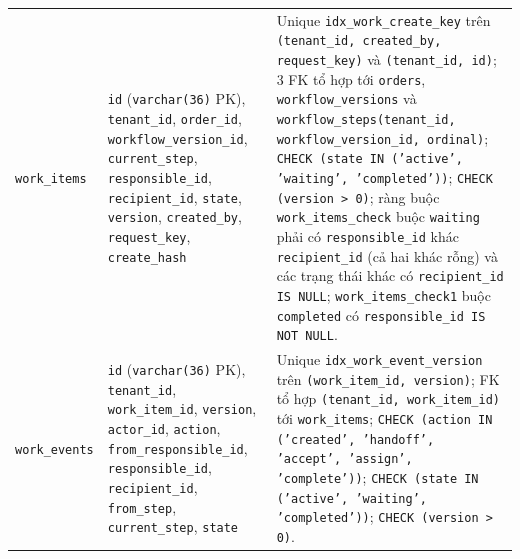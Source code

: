 \begin{table}[htbp]
\begin{tabularx}{\linewidth}{@{}
    >{\raggedright\arraybackslash}p{3.2cm}
    >{\raggedright\arraybackslash}p{5.2cm}
    >{\raggedright\arraybackslash}X@{}}
    \texttt{work\_items} &
    \texttt{id} (\texttt{varchar(36)} PK), \texttt{tenant\_id}, \texttt{order\_id}, \texttt{workflow\_version\_id}, \texttt{current\_step}, \texttt{responsible\_id}, \texttt{recipient\_id}, \texttt{state}, \texttt{version}, \texttt{created\_by}, \texttt{request\_key}, \texttt{create\_hash} &
    Unique \texttt{idx\_\hspace{0pt}work\_\hspace{0pt}create\_\hspace{0pt}key} trên \texttt{(tenant\_id, created\_by, request\_key)} và \texttt{(tenant\_id, id)}; 3 FK tổ hợp tới \texttt{orders}, \texttt{workflow\_\hspace{0pt}versions} và \texttt{workflow\_\hspace{0pt}steps(tenant\_id, workflow\_version\_id, ordinal)}; \texttt{CHECK (state IN ('active', 'waiting', 'completed'))}; \texttt{CHECK (version > 0)}; ràng buộc \texttt{work\_\hspace{0pt}items\_\hspace{0pt}check} buộc \texttt{waiting} phải có \texttt{responsible\_id} khác \texttt{recipient\_id} (cả hai khác rỗng) và các trạng thái khác có \texttt{recipient\_id IS NULL}; \texttt{work\_\hspace{0pt}items\_\hspace{0pt}check1} buộc \texttt{completed} có \texttt{responsible\_id IS NOT NULL}. \\
    \texttt{work\_events} &
    \texttt{id} (\texttt{varchar(36)} PK), \texttt{tenant\_id}, \texttt{work\_item\_id}, \texttt{version}, \texttt{actor\_id}, \texttt{action}, \texttt{from\_responsible\_id}, \texttt{responsible\_id}, \texttt{recipient\_id}, \texttt{from\_step}, \texttt{current\_step}, \texttt{state} &
    Unique \texttt{idx\_\hspace{0pt}work\_\hspace{0pt}event\_\hspace{0pt}version} trên \texttt{(work\_item\_id, version)}; FK tổ hợp \texttt{(tenant\_id, work\_item\_id)} tới \texttt{work\_items}; \texttt{CHECK (action IN ('created', 'handoff', 'accept', 'assign', 'complete'))}; \texttt{CHECK (state IN ('active', 'waiting', 'completed'))}; \texttt{CHECK (version > 0)}. \\
    \bottomrule
  \end{tabularx}
\end{table}

